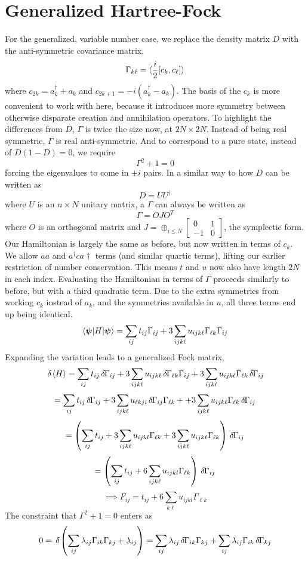 \documentclass[a4paper,11pt]{article}
\newcommand{\matNN}[4]{ \begin{bmatrix} {#1} & {#2} \\ {#3} & {#4}\end{bmatrix} }
\newcommand{\9}{\,\,\,\,\,\,\,\,\,}
\newcommand{\ichg}{\,\delta\hspace{-0.3mm}}
\begin{document}
\section{Generalized Hartree-Fock}
For the generalized, variable number case, we replace the density matrix $D$ with the anti-symmetric covariance matrix,
$$\Gamma_{k\ell} = \braket{\frac{i}{2}[c_k,c_\ell]}$$
where $c_{2k} = a^\dagger_k+a_k$ and $c_{2k+1} = -i(a_k^\dagger-a_k)$. The basis of the $c_k$ is more convenient to work with here, because it introduces more symmetry between otherwise disparate creation and annihilation operators. To highlight the differences from $D$, $\Gamma$ is twice the size now, at $2N\times 2N$. Instead of being real symmetric, $\Gamma$ is real anti-symmetric. And to correspond to a pure state, instead of $D(1-D) = 0$, we require
$$\Gamma^2 + 1=0$$
forcing the eigenvalues to come in $\pm i$ pairs. In a similar way to how $D$ can be written as
$$D = UU^\dagger$$
where $U$ is an $n\times N$ unitary matrix, a $\Gamma$ can always be written as
$$\Gamma = OJO^T$$
where $O$ is an orthogonal matrix and $J=\oplus_{i\le N}\matNN 01{-1}0$, the symplectic form. Our Hamiltonian is largely the same as before, but now written in terms of $c_k$. We allow $aa$ and $a^\dagger ca\dagger$ terms (and similar quartic terms), lifting our earlier restriction of number conservation. This means $t$ and $u$ now also have length $2N$ in each index. Evaluating the Hamiltonian in terms of $\Gamma$ proceeds similarly to before, but with a third quadratic term. Due to the extra symmetries from working $c_k$ instead of $a_k$, and the symmetries available in $u$, all three terms end up being identical.
$$\braket{\bm\psi|H|\bm\psi} = \sum_{ij} t_{ij}\Gamma_{ij} + 3\sum_{ijk\ell}u_{ijk\ell}\Gamma_{\ell k}\Gamma_{ij}$$
Expanding the variation leads to a generalized Fock matrix,
$$\ichg\braket{H} = \sum_{ij} t_{ij}\ichg\Gamma_{ij} + 3\sum_{ijk\ell}u_{ijk\ell}\ichg\Gamma_{\ell k}\Gamma_{ij} + 3\sum_{ijk\ell}u_{ijk\ell}\Gamma_{\ell k}\ichg\Gamma_{ij}$$
$$ = \sum_{ij} t_{ij}\ichg\Gamma_{ij} + 3\sum_{ijk\ell}u_{\ell kji}\ichg\Gamma_{ij}\Gamma_{\ell k} + + 3\sum_{ijk\ell}u_{ijk\ell}\Gamma_{\ell k}\ichg\Gamma_{ij}$$
$$ = \left(\sum_{ij} t_{ij} + 3\sum_{ijk\ell}u_{ijkl}\Gamma_{\ell k} + 3\sum_{ijk\ell}u_{ijk\ell}\Gamma_{\ell k}\right)\ichg\Gamma_{ij}$$
$$ = \left(\sum_{ij} t_{ij} + 6\sum_{ijk\ell}u_{ijkl}\Gamma_{\ell k}\right)\ichg\Gamma_{ij}$$
$$\implies F_{ij} = t_{ij} + 6\sum_{k\ell}u_{ijkl}\Gamma_{\ell k}$$
The constraint that $\Gamma^2 + 1 = 0$ enters as
$$0 = \ichg\left(\sum_{ij}\lambda_{ij} \Gamma_{ik}\Gamma_{kj} + \lambda_{ij}\right) = \sum_{ij}\lambda_{ij} \ichg\Gamma_{ik}\Gamma_{kj} + \sum_{ij}\lambda_{ij} \Gamma_{ik}\ichg\Gamma_{kj}$$
\end{document}

